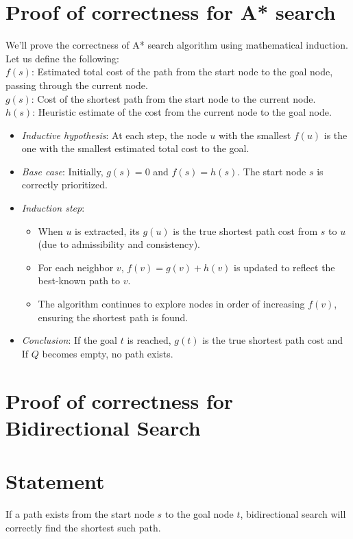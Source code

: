 \begin{appendices}
\section{Proof of correctness for A* search}\label{appendix:astar:correctness}
	We'll prove the correctness of A* search algorithm using mathematical induction. Let us define the following: \\
	$f(s)$: Estimated total cost of the path from the start node to the goal node, passing through the current node. \\
	$g(s)$: Cost of the shortest path from the start node to the current node. \\
	$h(s)$: Heuristic estimate of the cost from the current node to the goal node.
	\begin{itemize}
		\item \textit{Inductive hypothesis}: At each step, the node $u$ with the smallest $f(u)$ is the one with the smallest estimated total cost to the goal.
		\item \textit{Base case}: Initially, $g(s)=0$ and $f(s)=h(s)$. The start node $s$ is correctly prioritized.
		\item \textit{Induction step}: 
			\begin{itemize}
				\item When $u$ is extracted, its $g(u)$ is the true shortest path cost from $s$ to $u$ (due to admissibility and consistency).
				\item For each neighbor $v$, $f(v)=g(v)+h(v)$ is updated to reflect the best-known path to $v$.
				\item The algorithm continues to explore nodes in order of increasing $f(v)$, ensuring the shortest path is found.
			\end{itemize}
		\item \textit{Conclusion}: If the goal $t$ is reached, $g(t)$ is the true shortest path cost and If $Q$ becomes empty, no path exists.
	\end{itemize}
\section{Proof of correctness for Bidirectional Search}\label{appendix:Bidirectional:correctness}
\section*{Statement}
If a path exists from the start node $s$ to the goal node $t$, bidirectional search will correctly find the shortest such path.


\end{appendices}
